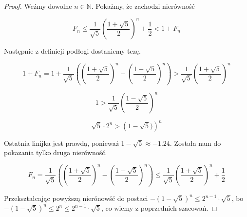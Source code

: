 \documentclass{article}
\begin{document}
\begin{proof}
Weźmy dowolne $n \in \mathbb{N}$.
Pokażmy, że zachodzi nierówność

$$F_n \leq \frac{1}{\sqrt{5}} \left( \frac{1+\sqrt{5}}{2} \right)^n + \frac{1}{2} < 1 + F_n$$

Następnie z definicji podłogi dostaniemy tezę.

$$
1 + F_n = 1+ \frac{1}{\sqrt{5}} \left( \left( \frac{1 + \sqrt{5}}{2} \right)^n - \left( \frac{1 - \sqrt{5}}{2} \right)^n  \right) > \frac{1}{\sqrt{5}} \left( \frac{1+\sqrt{5}}{2} \right)^n
$$

$$ 1 > \frac{1}{\sqrt{5}} \left( \frac{1-\sqrt{5}}{2} \right)^n$$

$$\sqrt{5} \cdot 2^n > \left(1-\sqrt{5}) \right)^n$$

Ostatnia linijka jest prawdą, ponieważ $1-\sqrt{5} \approx -1.24$. Została nam do pokazania tylko druga nierówność.

$$F_n = \frac{1}{\sqrt{5}} \left( \left( \frac{1 + \sqrt{5}}{2} \right)^n - \left( \frac{1 - \sqrt{5}}{2} \right)^n  \right)  \leq \frac{1}{\sqrt{5}} \left( \frac{1+\sqrt{5}}{2} \right)^n + \frac{1}{2} $$

Przekształcając powyższą nierónowść do postaci $-(1-\sqrt{5})^n \leq 2^{n-1} \cdot \sqrt{5}$, bo $-(1-\sqrt{5})^n \leq 2^n \leq 2^{n-1} \cdot \sqrt{5}$, co wiemy z poprzednich szacowań.
\end{proof}


\end{document}
